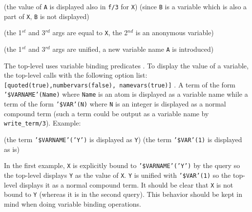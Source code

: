 \begin{CodeTwoCols}
\SkipLine
{} {(the value of \texttt{A} is displayed also in \texttt{f/3} for
\texttt{X})}
 {(since \texttt{B} is a variable which is also a part
of \texttt{X}, \texttt{B} is not displayed)}
\end{CodeTwoCols}

\begin{CodeTwoCols}
\SkipLine
{} {(the 1$^{st}$ and 3$^{rd}$ args are equal to \texttt{X},
the 2$^{nd}$ is an anonymous variable)}
\end{CodeTwoCols}

\begin{CodeTwoCols}
\SkipLine
{} {(the 1$^{st}$ and 3$^{rd}$ args are unified, a new
variable name \texttt{A} is introduced)}
\end{CodeTwoCols}

The top-level uses variable binding predicates .
To display the value of a variable, the top-level calls
 with the following option list:
\texttt{[\texttt{quoted(true)},\texttt{numbervars(false)},
\texttt{namevars(true)}]} . A term of the
form \texttt{'\$VARNAME'(Name)} where \texttt{Name} is an atom is displayed
as a variable name while a term of the form \texttt{'\$VAR'(N)} where
\texttt{N} is an integer is displayed as a normal compound term (such a term
could be output as a variable name by \texttt{write\_term/3}). Example:

\begin{CodeTwoCols}
\SkipLine
{} {(the term \texttt{'\$VARNAME'('Y')} is displayed as \texttt{Y})}
 {(the term \texttt{'\$VAR'(1)} is displayed as is)}
\end{CodeTwoCols}

\begin{CodeTwoCols}
\SkipLine
{}
\end{CodeTwoCols}

In the first example, \texttt{X} is explicitly bound to
\texttt{'\$VARNAME'('Y')} by the query so the top-level displays \texttt{Y}
as the value of \texttt{X}. \texttt{Y} is unified with \texttt{'\$VAR'(1)} so
the top-level displays it as a normal compound term. It should be clear that
\texttt{X} is not bound to \texttt{Y} (whereas it is in the second
query). This behavior should be kept in mind when doing variable binding
operations.

